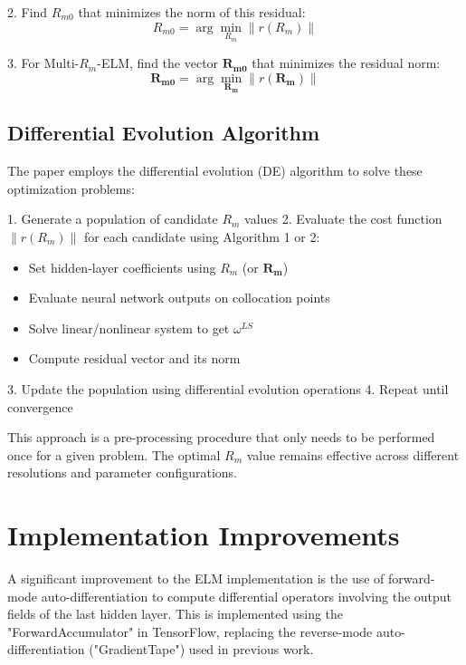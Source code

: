 \documentclass[11pt,a4paper]{article}
\begin{document}
2. Find $R_{m0}$ that minimizes the norm of this residual:
\begin{equation}
    R_{m0} = \arg\min_{R_m} \|r(R_m)\|
\end{equation}

3. For Multi-$R_m$-ELM, find the vector $\mathbf{R_{m0}}$ that minimizes the residual norm:
\begin{equation}
    \mathbf{R_{m0}} = \arg\min_{\mathbf{R_m}} \|r(\mathbf{R_m})\|
\end{equation}

\subsection{Differential Evolution Algorithm}

The paper employs the differential evolution (DE) algorithm to solve these optimization problems:

1. Generate a population of candidate $R_m$ values
2. Evaluate the cost function $\|r(R_m)\|$ for each candidate using Algorithm 1 or 2:
   \begin{itemize}
      \item Set hidden-layer coefficients using $R_m$ (or $\mathbf{R_m}$)
      \item Evaluate neural network outputs on collocation points
      \item Solve linear/nonlinear system to get $\omega^{LS}$
      \item Compute residual vector and its norm
   \end{itemize}
3. Update the population using differential evolution operations
4. Repeat until convergence

This approach is a pre-processing procedure that only needs to be performed once for a given problem. The optimal $R_m$ value remains effective across different resolutions and parameter configurations.

\section{Implementation Improvements}

A significant improvement to the ELM implementation is the use of forward-mode auto-differentiation to compute differential operators involving the output fields of the last hidden layer. This is implemented using the "ForwardAccumulator" in TensorFlow, replacing the reverse-mode auto-differentiation ("GradientTape") used in previous work.
\end{document}
